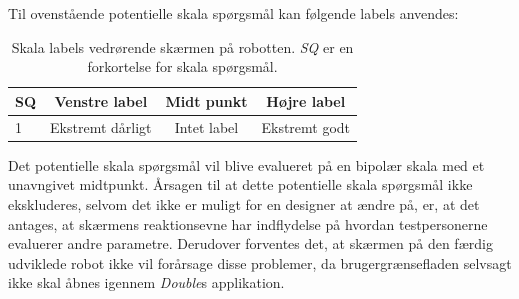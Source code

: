 %
Til ovenstående potentielle skala spørgsmål kan følgende labels anvendes:
%
\begin{table}[H]
	\centering 
	\begin{tabular}{l|c|c|c}
		SQ     & Venstre label & Midt punkt & Højre label \\\hline
		1   & Ekstremt dårligt & Intet label & Ekstremt godt                 
	\end{tabular}
\caption{Skala labels vedrørende skærmen på robotten. \textit{SQ} er en forkortelse for skala spørgsmål.}
	\label{tab:SkaermenR}
\end{table}
\noindent
%
Det potentielle skala spørgsmål vil blive evalueret på en bipolær skala med et unavngivet midtpunkt. Årsagen til at dette potentielle skala spørgsmål ikke ekskluderes, selvom det ikke er muligt for en designer at ændre på, er, at det antages, at skærmens reaktionsevne har indflydelse på hvordan testpersonerne evaluerer andre parametre. Derudover forventes det, at skærmen på den færdig udviklede robot ikke vil forårsage disse problemer, da brugergrænsefladen selvsagt ikke skal åbnes igennem \textit{Double}s applikation. 
\newpage
%
